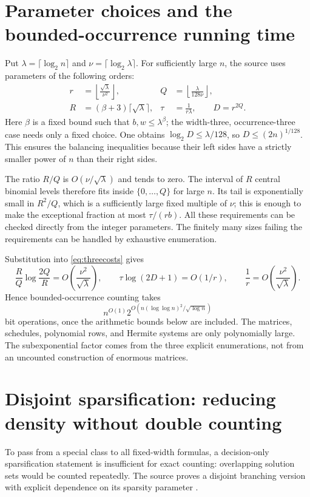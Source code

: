 \documentclass[11pt,a4paper]{article}
\numberwithin{equation}{section}
\theoremstyle{definition}
\theoremstyle{remark}
\begin{document}
\section{Parameter choices and the bounded-occurrence running time}
\label{sec:parameters}
Put $\lambda=\lceil\log_2n\rceil$ and
$\nu=\lceil\log_2\lambda\rceil$. For sufficiently large $n$, the source uses
parameters of the following orders:
\begin{align*}
 r&=\left\lfloor\frac{\sqrt\lambda}{\nu^2}\right\rfloor,
 &Q&=\left\lfloor\frac{\lambda}{128\nu}\right\rfloor,\\
 R&=(\beta+3)\lceil\sqrt\lambda\rceil,
 &\tau&=\frac1{r\lambda},\qquad D=r^{2Q}.
\end{align*}
Here $\beta$ is a fixed bound such that $b,w\le\lambda^\beta$; the
width-three, occurrence-three case needs only a fixed choice.
One obtains $\log_2D\le\lambda/128$, so $D\le(2n)^{1/128}$.
This ensures the balancing inequalities because their left sides have a
strictly smaller power of $n$ than their right sides.

The ratio $R/Q$ is $O(\nu/\sqrt\lambda)$ and tends to zero. The interval of
$R$ central binomial levels therefore fits inside $\{0,\ldots,Q\}$ for large
$n$. Its tail is exponentially small in $R^2/Q$, which is a sufficiently large
fixed multiple of $\nu$; this is enough to make the exceptional fraction at
most $\tau/(rb)$. All these requirements can be checked directly from the
integer parameters. The finitely many sizes failing the requirements can be
handled by exhaustive enumeration.

Substitution into \eqref{eq:threecosts} gives
\[
 \frac RQ\log\frac{2Q}{R}=O\left(\frac{\nu^2}{\sqrt\lambda}\right),
 \qquad \tau\log(2D+1)=O(1/r),
 \qquad \frac1r=O\left(\frac{\nu^2}{\sqrt\lambda}\right).
\]
Hence bounded-occurrence counting takes
\begin{equation}\label{eq:bounded}
 n^{O(1)}2^{O(n(\log\log n)^2/\sqrt{\log n})}
\end{equation}
bit operations, once the arithmetic bounds below are included.
The matrices, schedules, polynomial rows, and Hermite systems are only
polynomially large. The subexponential factor comes from the three explicit
enumerations, not from an uncounted construction of enormous matrices.

\section{Disjoint sparsification: reducing density without double counting}
\label{sec:sparsification}
To pass from a special class to all fixed-width formulas, a decision-only
sparsification statement is insufficient for exact counting: overlapping
solution sets would be counted repeatedly. The source proves a disjoint
branching version with explicit dependence on its sparsity parameter
\cite{paper}.
\end{document}
